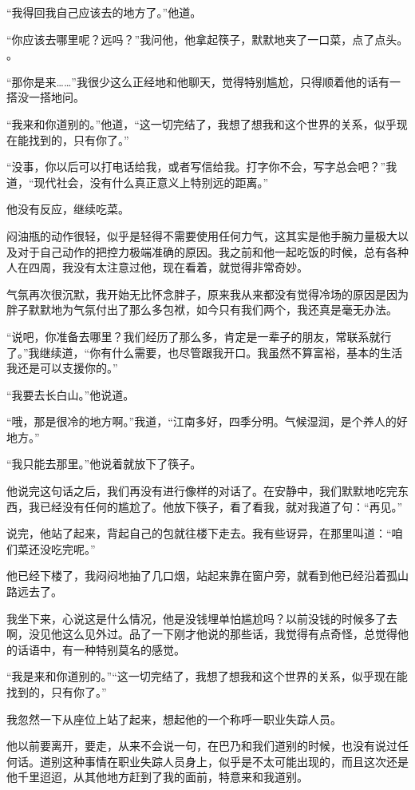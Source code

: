 “我得回我自己应该去的地方了。”他道。

“你应该去哪里呢？远吗？”我问他，他拿起筷子，默默地夹了一口菜，点了点头。 。

“那你是来……”我很少这么正经地和他聊天，觉得特别尴尬，只得顺着他的话有一搭没一搭地问。

“我来和你道别的。”他道，“这一切完结了，我想了想我和这个世界的关系，似乎现在能找到的，只有你了。”

“没事，你以后可以打电话给我，或者写信给我。打字你不会，写字总会吧？”我道，“现代社会，没有什么真正意义上特别远的距离。”

他没有反应，继续吃菜。

闷油瓶的动作很轻，似乎是轻得不需要使用任何力气，这其实是他手腕力量极大以及对于自己动作的把控力极端准确的原因。我之前和他一起吃饭的时候，总有各种人在四周，我没有太注意过他，现在看着，就觉得非常奇妙。

气氛再次很沉默，我开始无比怀念胖子，原来我从来都没有觉得冷场的原因是因为胖子默默地为气氛付出了那么多包袱，如今只有我们两个，我还真是毫无办法。

“说吧，你准备去哪里？我们经历了那么多，肯定是一辈子的朋友，常联系就行了。”我继续道，“你有什么需要，也尽管跟我开口。我虽然不算富裕，基本的生活我还是可以支援你的。”

“我要去长白山。”他说道。

“哦，那是很冷的地方啊。”我道，“江南多好，四季分明。气候湿润，是个养人的好地方。”

“我只能去那里。”他说着就放下了筷子。

他说完这句话之后，我们再没有进行像样的对话了。在安静中，我们默默地吃完东西，我已经没有任何的尴尬了。他放下筷子，看了看我，就对我道了句：“再见。”

说完，他站了起来，背起自己的包就往楼下走去。我有些讶异，在那里叫道：“咱们菜还没吃完呢。”

他已经下楼了，我闷闷地抽了几口烟，站起来靠在窗户旁，就看到他已经沿着孤山路远去了。

我坐下来，心说这是什么情况，他是没钱埋单怕尴尬吗？以前没钱的时候多了去啊，没见他这么见外过。品了一下刚才他说的那些话，我觉得有点奇怪，总觉得他的话语中，有一种特别莫名的感觉。

“我是来和你道别的。”“这一切完结了，我想了想我和这个世界的关系，似乎现在能找到的，只有你了。”

我忽然一下从座位上站了起来，想起他的一个称呼一职业失踪人员。

他以前要离开，要走，从来不会说一句，在巴乃和我们道别的时候，也没有说过任何话。道别这种事情在职业失踪人员身上，似乎是不太可能出现的，而且这次还是他千里迢迢，从其他地方赶到了我的面前，特意来和我道别。

